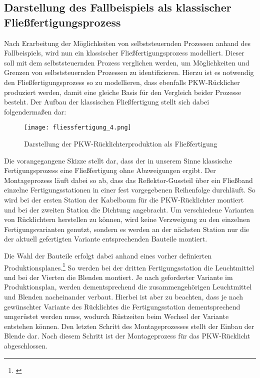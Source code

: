 \subsection{Darstellung des Fallbeispiels als klassischer
Fließfertigungsprozess}
\label{Modellierung}

Nach Erarbeitung der Möglichkeiten von selbststeuernden Prozessen anhand des
Fallbeispiels, wird nun ein klassischer Fließfertigungsprozess modelliert.
Dieser soll mit dem selbststeuernden Prozess verglichen werden, um Möglichkeiten
und Grenzen von selbststeuernden Prozessen zu identifizieren. Hierzu ist es
notwendig den Fließfertigungsprozess so zu modellieren, dass ebenfalls
PKW-Rücklicher produziert werden, damit eine gleiche Basis für den Vergleich
beider Prozesse besteht. Der Aufbau der klassischen Fließfertigung stellt sich
dabei folgendermaßen dar:

\begin{figure}[htb] 
\centering
\texttt{[image: fliessfertigung\_4.png]}
\caption[Darstellung der PKW-Rücklichterproduktion als
Fließfertigung]{Darstellung der PKW-Rücklichterproduktion als
Fließfertigung\protect\footnotemark}
\label{fig:Fliessfertigung}
\end{figure}

Die vorangegangene Skizze stellt dar, dass der in unserem Sinne klassische
Fertigungsprozess eine Fließfertigung ohne Abzweigungen ergibt. Der
Montageprozess läuft dabei so ab, dass das Reflektor-Gussteil über ein Fließband
einzelne Fertigungsstationen in einer fest vorgegebenen Reihenfolge durchläuft.
So wird bei der ersten Station der Kabelbaum für die PKW-Rücklichter montiert
und bei der zweiten Station die Dichtung angebracht. Um verschiedene Varianten
von Rücklichtern herstellen zu können, wird keine Verzweigung zu den einzelnen
Fertigungsvarianten genutzt, sondern es werden an der nächsten Station nur die
der aktuell gefertigten Variante entsprechenden Bauteile montiert.

Die Wahl der Bauteile erfolgt dabei anhand eines vorher definierten
Produktionsplanes.\footnote{\citet[S.~331]{arnold2008}} So werden bei der
dritten Fertigungsstation die Leuchtmittel und bei der Vierten die Blenden montiert. Je nach geforderter Variante im
Produktionsplan, werden dementsprechend die zusammengehörigen Leuchtmittel und
Blenden nacheinander verbaut. Hierbei ist aber zu beachten, dass je nach
gewünschter Variante des Rücklichtes die Fertigungsstation dementsprechend
umgerüstet werden muss, wodurch Rüstzeiten beim Wechsel der Variante entstehen
können. Den letzten Schritt des Montageprozesses stellt der Einbau der Blende
dar. Nach diesem Schritt ist der Montageprozess für das PKW-Rücklicht
abgeschlossen.
 